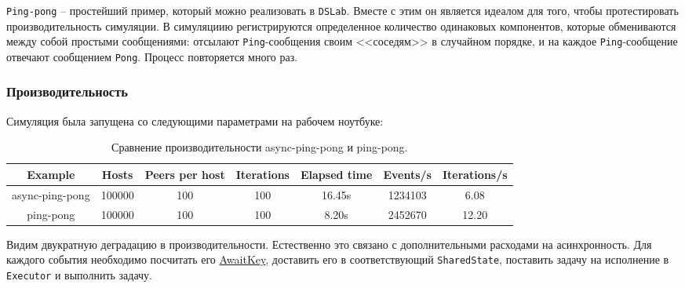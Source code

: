 \texttt{Ping-pong} -- простейший пример, который можно реализовать в \texttt{DSLab}. Вместе с этим он является идеалом для того, чтобы протестировать производительность симуляции. В симуляциию регистрируются определенное количество одинаковых компонентов, которые обмениваются между собой простыми сообщениями: отсылают \texttt{Ping}-сообщения своим <<соседям>> в случайном порядке, и на каждое \texttt{Ping}-сообщение отвечают сообщением \texttt{Pong}. Процесс повторяется много раз.

\subsubsection{Производительность}

Симуляция была запущена со следующими параметрами на рабочем ноутбуке:
\begin{table}[H]
    \centering
    \begin{tabular}{|c|c|c|c|c|c|c|}
        \hline
        Example & Hosts & Peers per host & Iterations & Elapsed time & Events/s & Iterations/s \\
        \hline
        async-ping-pong & 100000 & 100 & 100 & 16.45s & 1234103 & 6.08\\
        \hline
        ping-pong & 100000 & 100 & 100 & 8.20s & 2452670 & 12.20\\
        \hline
    \end{tabular}
    \caption{Сравнение производительности async-ping-pong и ping-pong.}
    \label{cmp:ping-pong}
\end{table}

Видим двукратную деградацию в производительности. Естественно это связано с дополнительными расходами на асинхронность. Для каждого события необходимо посчитать его \hyperref[awaitkey]{AwaitKey}, доставить его в соответствующий \texttt{SharedState}, поставить задачу на исполнение в \texttt{Executor} и выполнить задачу.

